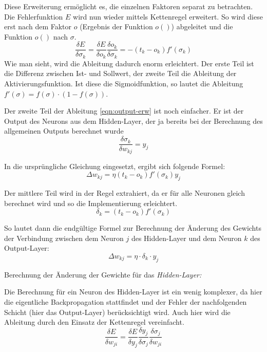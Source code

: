 Diese Erweiterung ermöglicht es, die einzelnen Faktoren separat zu betrachten. Die Fehlerfunktion $E$ wird nun wieder mittels Kettenregel erweitert. So wird diese erst nach dem Faktor $o$ (Ergebnis der Funktion $o()$) abgeleitet und die Funktion $o()$ nach $\sigma$.
\begin{equation}
\frac{\delta E}{\delta \sigma_{k}} = \frac{\delta E}{\delta o_{k}} \frac{\delta o_k}{\delta \sigma_k} = -(t_k - o_k) f'(\sigma_k)
\end{equation}
Wie man sieht, wird die Ableitung dadurch enorm erleichtert. Der erste Teil ist die Differenz zwischen Ist- und Sollwert, der zweite Teil die Ableitung der Aktivierungsfunktion. Ist diese die Sigmoidfunktion, so lautet die Ableitung $f'(\sigma)=f(\sigma)\cdot (1-f(\sigma))$.

Der zweite Teil der Ableitung \ref{eqn:output-erw} ist noch einfacher. Er ist der Output des Neurons aus dem Hidden-Layer, der ja bereits bei der Berechnung des allgemeinen Outputs berechnet wurde
\begin{equation}
\frac{\delta\sigma_k}{\delta w_{kj}}=y_j
\end{equation}

In die ursprüngliche Gleichung eingesetzt, ergibt sich folgende Formel:
\begin{equation}
\Delta w_{kj} = \eta (t_k - o_k) f'(\sigma_k)y_j
\end{equation}

Der mittlere Teil wird in der Regel extrahiert, da er für alle Neuronen gleich berechnet wird und so die Implementierung erleichtert.
\begin{equation}
\delta_k = (t_k - o_k) f'(\sigma_k)
\end{equation}

So lautet dann die endgültige Formel zur Berechnung der Änderung des Gewichts der Verbindung zwischen dem Neuron $j$ des Hidden-Layer und dem Neuron $k$ des Output-Layer:
\begin{equation}
\Delta w_{kj} = \eta\cdot \delta_k \cdot y_j
\end{equation}

Berechnung der Änderung der Gewichte für das \emph{Hidden-Layer:}

Die Berechnung für ein Neuron des Hidden-Layer ist ein wenig komplexer, da hier die eigentliche Backpropagation stattfindet und der Fehler der nachfolgenden Schicht (hier das Output-Layer) berücksichtigt wird. Auch hier wird die Ableitung durch den Einsatz der Kettenregel vereinfacht.
\begin{equation}
\frac{\delta E}{\delta w_{ji}} = \frac{\delta E}{\delta y_j} \frac{\delta y_j}{\delta\sigma_j}\frac{\delta\sigma_j}{\delta w_{ji}}
\end{equation}

